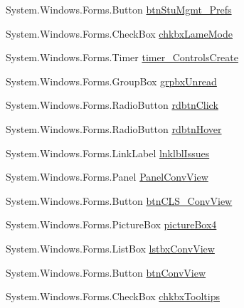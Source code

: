 \begin{DoxyCompactItemize}
\item 
\-System.\-Windows.\-Forms.\-Button \hyperlink{class_sr_p___classroom_inq_1_1frm_classrrom_inq_af14017019a644ec6c1d32d49fb0e59f1}{btn\-Stu\-Mgmt\-\_\-\-Prefs}
\item 
\-System.\-Windows.\-Forms.\-Check\-Box \hyperlink{class_sr_p___classroom_inq_1_1frm_classrrom_inq_ae2a9d3b663f7c88374a93c3cd9ef6eca}{chkbx\-Lame\-Mode}
\item 
\-System.\-Windows.\-Forms.\-Timer \hyperlink{class_sr_p___classroom_inq_1_1frm_classrrom_inq_aa53f33f4a7245799242c52b4ceff8dab}{timer\-\_\-\-Controls\-Create}
\item 
\-System.\-Windows.\-Forms.\-Group\-Box \hyperlink{class_sr_p___classroom_inq_1_1frm_classrrom_inq_a0e65b517d6f3d5bc8e159ff6283dc508}{grpbx\-Unread}
\item 
\-System.\-Windows.\-Forms.\-Radio\-Button \hyperlink{class_sr_p___classroom_inq_1_1frm_classrrom_inq_a116a0f948fdc7187ae7dc028026eec59}{rdbtn\-Click}
\item 
\-System.\-Windows.\-Forms.\-Radio\-Button \hyperlink{class_sr_p___classroom_inq_1_1frm_classrrom_inq_a2bee4d450744662c189d99c17658dac7}{rdbtn\-Hover}
\item 
\-System.\-Windows.\-Forms.\-Link\-Label \hyperlink{class_sr_p___classroom_inq_1_1frm_classrrom_inq_a814cf817eced89d772f9cba1053bf81b}{lnklbl\-Issues}
\item 
\-System.\-Windows.\-Forms.\-Panel \hyperlink{class_sr_p___classroom_inq_1_1frm_classrrom_inq_ae5d62ffd766ae877bf37d56567d836d5}{\-Panel\-Conv\-View}
\item 
\-System.\-Windows.\-Forms.\-Button \hyperlink{class_sr_p___classroom_inq_1_1frm_classrrom_inq_a2e74908e00f7502b511e8726d1574d7e}{btn\-C\-L\-S\-\_\-\-Conv\-View}
\item 
\-System.\-Windows.\-Forms.\-Picture\-Box \hyperlink{class_sr_p___classroom_inq_1_1frm_classrrom_inq_ab68823cc3bc21a92261c2cd687b8d85f}{picture\-Box4}
\item 
\-System.\-Windows.\-Forms.\-List\-Box \hyperlink{class_sr_p___classroom_inq_1_1frm_classrrom_inq_aa78736e6fefabc449eb2ac37ce4f5f60}{lstbx\-Conv\-View}
\item 
\-System.\-Windows.\-Forms.\-Button \hyperlink{class_sr_p___classroom_inq_1_1frm_classrrom_inq_ab75b7c14e1f4b71b6513122c99dbe532}{btn\-Conv\-View}
\item 
\-System.\-Windows.\-Forms.\-Check\-Box \hyperlink{class_sr_p___classroom_inq_1_1frm_classrrom_inq_a1952935fe5b823dcc597f5aafd7436aa}{chkbx\-Tooltips}
\item 

\end{DoxyCompactItemize}
